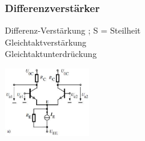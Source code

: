          \subsubsection{Differenzverstärker}
             \begin{minipage}[T]{12cm}
                 Differenz-Verstärkung
                 \hspace{8.4mm} ; S = Steilheit\\
                 Gleichtaktverstärkung
                 \hspace{8.1mm}\\
                 Gleichtaktunterdrückung
                 \hspace{3.8mm}
             \end{minipage}
             \begin{minipage}{4cm}
                 \includegraphics[height=3cm]{./images/BipTraDiffAmp.png}
             \end{minipage}\\
             
